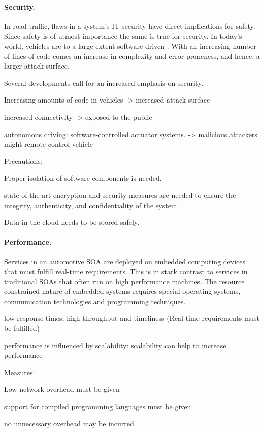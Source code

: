 \paragraph{Security.}
In road traffic, flaws in a system's IT security have direct implications for safety. Since safety is of utmost importance the same is true for security. In today's world, vehicles are to a large extent software-driven \cite{broy2006challenges}. With an increasing number of lines of code comes an increase in complexity and error-proneness, and hence, a larger attack surface. 

Several developments call for an increased emphasis on security.

Increasing amounts of code in vehicles -> increased attack surface

increased connectivity -> exposed to the public 

autonomous driving: software-controlled actuator systems. -> malicious attackers might remote control vehicle


Precautions:

Proper isolation of software components is needed.

state-of-the-art encryption and security measures are needed to ensure the integrity, authenticity, and confidentiality of the system.

Data in the cloud needs to be stored safely.


\paragraph{Performance.}
Services in an automotive SOA are deployed on embedded computing devices that must fulfill real-time requirements. This is in stark contrast to services in traditional SOAs that often run on high performance machines. The resource constrained nature of embedded systems requires special operating systems, communication technologies and programming techniques.

low response times, high throughput and timeliness (Real-time requirements must be fulfilled)

performance is influenced by scalability: scalability can help to increase performance

Measures:

Low network overhead must be given

support for compiled programming languages must be given

no unnecessary overhead may be incurred


